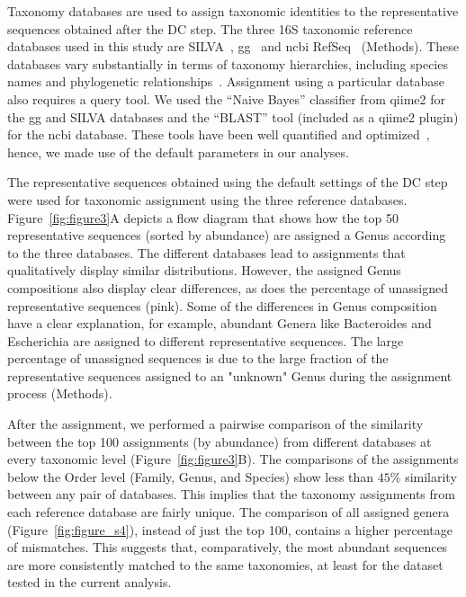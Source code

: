 \documentclass[letterpaper,12pt]{article}
\begin{document}
  Taxonomy databases are used to assign taxonomic identities to the representative sequences obtained after the DC step.
  The three 16S taxonomic reference databases used in this study are SILVA~\cite{Quast2012}, \ac{gg}~\cite{DeSantis2006} and \ac{ncbi} RefSeq~\cite{Sayers2009} (Methods).
  These databases vary substantially in terms of taxonomy hierarchies, including species names and phylogenetic relationships~\cite{Balvociute2017}.
  Assignment using a particular database also requires a query tool.
  We used the ``Naive Bayes'' classifier from \ac{qiime2} for the \ac{gg} and SILVA databases and the ``BLAST'' tool (included as a \ac{qiime2} plugin) for the \ac{ncbi} database.
  These tools have been well quantified and optimized~\cite{bokulichOptimizingTaxonomicClassification2018}, hence, we made use of the default parameters in our analyses.

  The representative sequences obtained using the default settings of the DC step were used for taxonomic assignment using the three reference databases.
  Figure~\ref{fig:figure3}A depicts a flow diagram that shows how the top 50 representative sequences (sorted by abundance) are assigned a Genus according to the three databases.
  The different databases lead to assignments that qualitatively display similar distributions. However, the assigned Genus compositions also display clear differences, as does the percentage of unassigned representative sequences (pink).
  Some of the differences in Genus composition have a clear explanation, for example, abundant Genera like Bacteroides and Escherichia are assigned to different representative sequences.
  The large percentage of unassigned sequences is due to the large fraction of the representative sequences assigned to an "unknown" Genus during the assignment process (Methods).

  After the assignment, we performed a pairwise comparison of the similarity between the top 100 assignments (by abundance) from different databases at every taxonomic level (Figure~\ref{fig:figure3}B).
  The comparisons of the assignments below the Order level (Family, Genus, and Species) show less than $45\%$ similarity between any pair of databases.
  This implies that the taxonomy assignments from each reference database are fairly unique.
  The comparison of all assigned genera (Figure~\ref{fig:figure_s4}), instead of just the top 100, contains a higher percentage of mismatches.
  This suggests that, comparatively, the most abundant sequences are more consistently matched to the same taxonomies, at least for the dataset tested in the current analysis.
\end{document}
